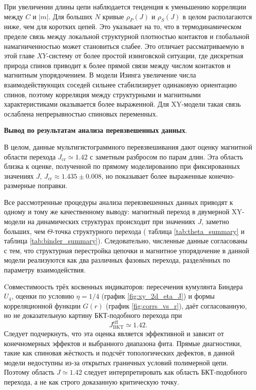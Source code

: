        
        При увеличении длины цепи наблюдается тенденция к уменьшению
       корреляции между $C$ и $|m|$. 
       Для больших $N$ кривые $\rho_P(J)$ и
       $\rho_S(J)$ в целом располагаются ниже, чем для коротких цепей. 
       Это указывает на то, что в термодинамическом пределе связь между локальной
       структурной плотностью контактов и глобальной намагниченностью может
       становиться слабее. 
       Это отличает рассматриваемую в этой главе $XY$-систему от более простой изинговской      ситуации, где дискретная природа спинов приводит к более прямой связи
       между числом контактов и магнитным упорядочением. 
       В модели Изинга увеличение
       числа взаимодействующих соседей сильнее стабилизирует одинаковую
       ориентацию спинов, поэтому корреляция между структурными и магнитными
       характеристиками оказывается более выраженной. 
       Для XY-модели такая связь
       ослаблена непрерывностью спиновых переменных.
        
       
       
       
        \textbf{Вывод по результатам анализа перевзвешенных данных}. 
        
        В целом, данные мультигистограммного  перевзвешивания дают оценку магнитной области перехода
        $J_{\mathrm{cr}}\simeq 1.42$ с заметным разбросом по парам длин. Эта область
        близка к оценке, полученной по прямому моделированию при фиксированных
        значениях $J$, $J_{\mathrm{cr}}\approx 1.435\pm0.008$, но показывает более
        выраженные конечно-размерные поправки.
        
Все рассмотренные процедуры анализа перевзвешенных данных приводят к одному и тому же качественному выводу: магнитный переход в двумерной XY-модели на динамических структурах происходит при значениях $J$, заметно больших, чем $\Theta$-точка структурного перехода ( таблица \ref{tab:theta_summary} и таблица \ref{tab:binder_summary}). 
  Следовательно, численные данные согласованы с тем, что структурная перестройка цепочки и магнитное упорядочение в данной модели реализуются как два различных фазовых перехода, разделённых по параметру взаимодействия.
  
  
  Cовместимоость трёх косвенных индикаторов: пересечения
  кумулянта Биндера $U_4$, оценки по условию $\eta=1/4$ (график \ref{fig:xy_2d_eta_J}) и формы
  корреляционной функции $G(r)$ (график \ref{fig:corrs_vs_r}), даёт согласованную, но не доказательную
  картину БКТ-подобного перехода при
  \[
  J_{\mathrm{BKT}}^{\mathrm{eff}} \simeq 1.42.
  \]
  Следует подчеркнуть, что эта оценка является эффективной и зависит от
  конечномерных эффектов и выбранного диапазона фита. Прямые диагностики,
  такие как спиновая жёсткость и подсчёт топологических дефектов, в данной
  модели недоступны из-за открытых граничных
  условий полимерной цепи. 
  Поэтому область $J\simeq 1.42$ следует
  интерпретировать как область БКТ-подобного перехода, а не как строго
  доказанную критическую точку.
  
